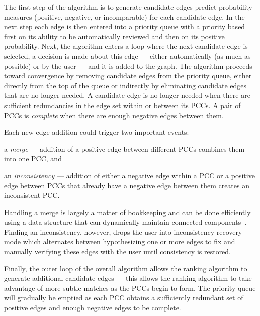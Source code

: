 The first step of the algorithm is to generate candidate edges predict probability measures (positive, negative,
  or incomparable) for each candidate edge.
In the next step each edge is then entered into a priority queue with a priority based first on its ability to be
  automatically reviewed and then on its positive probability.
Next, the algorithm enters a loop where the next candidate edge is selected, a decision is made about this edge
  --- either automatically (as much as possible) or by the user --- and it is added to the graph.
The algorithm proceeds toward convergence by removing candidate edges from the priority queue, either directly
  from the top of the queue or indirectly by eliminating candidate edges that are no longer needed.
A candidate edge is no longer needed when there are sufficient redundancies in the edge set within or between its
  PCCs.
A pair of PCCs is \emph{complete} when there are enough negative edges between them.

Each new edge addition could trigger two important events:
\begin{enumin}
    \item a \emph{merge} --- addition of a positive edge between different
      PCCs combines them into one PCC, and

    \item an \emph{inconsistency} --- addition of either a negative edge within a PCC or a positive edge between
      PCCs that already have a negative edge between them creates an inconsistent PCC.
\end{enumin}
Handling a merge is largely a matter of bookkeeping and can be done efficiently using a data structure that can
  dynamically maintain connected components~\cite{jacob_holm_poly_logarithmic_1998}.
Finding an inconsistency, however, drops the user into inconsistency recovery mode which alternates between
  hypothesizing one or more edges to fix and manually verifying these edges with the user until consistency is
  restored.

Finally, the outer loop of the overall algorithm allows the ranking algorithm to generate additional candidate
  edges --- this allows the ranking algorithm to take advantage of more subtle matches as the PCCs begin to form.
The priority queue will gradually be emptied as each PCC obtains a sufficiently redundant set of positive edges
  and enough negative edges to be complete.

